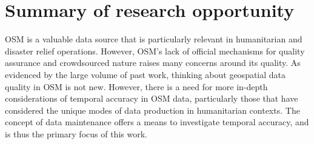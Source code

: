 \section{Summary of research opportunity}

OSM is a valuable data source that is particularly relevant in humanitarian and disaster relief operations. However, OSM’s lack of official mechanisms for quality assurance and crowdsourced nature raises many concerns around its quality. As evidenced by the large volume of past work, thinking about geospatial data quality in OSM is not new. However, there is a need for more in-depth considerations of temporal accuracy in OSM data, particularly those that have considered the unique modes of data production in humanitarian contexts. The concept of data maintenance offers a means to investigate temporal accuracy, and is thus the primary focus of this work.